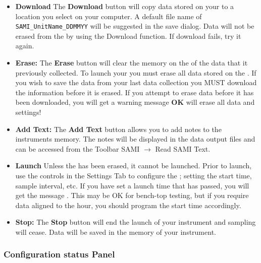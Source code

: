 \begin{itemize}
    \item[] \textbf{Download}
    The \textbf{Download} button will copy data stored on your \instType{} to a location you select on your computer.  A default file name of \verb|SAMI_UnitName_DDMMYY| will be suggested in the save dialog. Data will not be erased from the \instType{} by using the Download function.  If download fails, try it again.
    
    \item[] \textbf{Erase:}
    The \textbf{Erase} button will clear the memory on the \instType{} of the data that it previously collected. To launch your \instType{} you must erase all data stored on the \instType{}. If you wish to save the data from your last data collection you MUST download the information before it is erased. If you attempt to erase data before it has been downloaded, you will get a warning message  \textbf{OK} will erase all data and settings! 
    
    \item[] \textbf{Add Text:}
    The \textbf{Add Text} button allows you to add notes to the instruments memory. The notes will be displayed in the data output files and can be accessed from the Toolbar SAMI $\rightarrow$ Read SAMI Text.  
    
    \item[] \textbf{Launch}
    \label{Launch:}
    Unless the \instType{} has been erased, it cannot be launched. Prior to launch, use the controls in the Settings Tab to configure the \instType{}; setting the start time, sample interval, etc.  
    If you have set a launch time that has passed, you will get the message . This may be OK for bench-top testing, but if you require data aligned to the hour, you should program the start time accordingly.
           
    \item[] \textbf{Stop:}
    The \textbf{Stop} button will end the launch of your instrument and sampling will cease. Data will be saved in the memory of your instrument.
\end{itemize}


\subsubsection{Configuration status Panel} 

